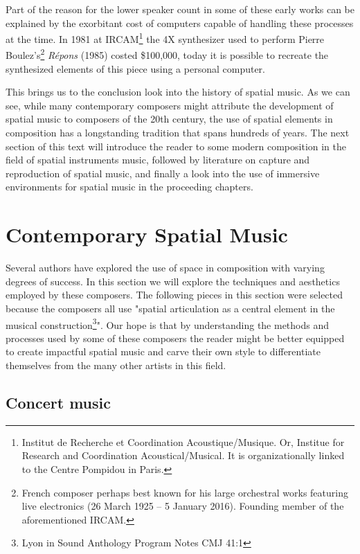 Part of the reason for the lower speaker count in some of these early works can be explained by the exorbitant cost of computers capable of handling these processes at the time. In 1981 at IRCAM\footnote{Institut de Recherche et Coordination Acoustique/Musique. Or, Institue for Research and Coordination Acoustical/Musical. It is organizationally linked to the Centre Pompidou in Paris.} the 4X synthesizer used to perform Pierre Boulez's\footnote{French composer perhaps best known for his large orchestral works featuring live electronics (26 March 1925 – 5 January 2016). Founding member of the aforementioned IRCAM.} \textit{Répons} (1985) costed \$100,000, today it is possible to recreate the synthesized elements of this piece using a personal computer. 

This brings us to the conclusion look into the history of spatial music. As we can see, while many contemporary composers might attribute the development of spatial music to composers of the 20th century, the use of spatial elements in composition has a longstanding tradition that spans hundreds of years. The next section of this text will introduce the reader to some modern composition in the field of spatial instruments music, followed by literature on capture and reproduction of spatial music, and finally a look into the use of immersive environments for spatial music in the proceeding chapters.

\section{Contemporary Spatial Music} \label{sec:contemp_works}

Several authors have explored the use of space in composition with varying degrees of success. In this section we will explore the techniques and aesthetics employed by these composers. The following pieces in this section were selected because the composers all use "spatial articulation as a central element in the musical construction\footnote{Lyon in Sound Anthology Program Notes CMJ 41:1}". Our hope is that by understanding the methods and processes used by some of these composers the reader might be better equipped to create impactful spatial music and carve their own style to differentiate themselves from the many other artists in this field. 

\subsection{Concert music}


